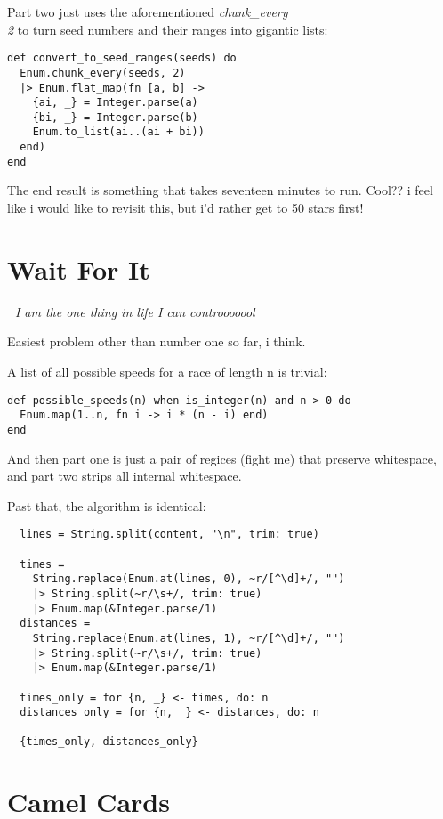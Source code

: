 \documentclass{article}
\begin{document}
Part two just uses the aforementioned \textit{chunk\_every\\2} to turn seed numbers and their ranges into gigantic lists:
\begin{verbatim}
def convert_to_seed_ranges(seeds) do
  Enum.chunk_every(seeds, 2)
  |> Enum.flat_map(fn [a, b] ->
    {ai, _} = Integer.parse(a)
    {bi, _} = Integer.parse(b)
    Enum.to_list(ai..(ai + bi))
  end)
end
\end{verbatim}

The end result is something that takes seventeen minutes to run. Cool?? i feel like i would like to revisit this, but i'd rather get to 50 stars first!

\section{Wait For It}

\textit{🎵 I am the one thing in life I can controoooool~}

Easiest problem other than number one so far, i think.

A list of all possible speeds for a race of length n is trivial:
\begin{verbatim}
def possible_speeds(n) when is_integer(n) and n > 0 do
  Enum.map(1..n, fn i -> i * (n - i) end)
end
\end{verbatim}

And then part one is just a pair of regices (fight me) that preserve whitespace, and part two strips all internal whitespace.

Past that, the algorithm is identical:
\begin{verbatim}
  lines = String.split(content, "\n", trim: true)

  times =
    String.replace(Enum.at(lines, 0), ~r/[^\d]+/, "")
    |> String.split(~r/\s+/, trim: true)
    |> Enum.map(&Integer.parse/1)
  distances =
    String.replace(Enum.at(lines, 1), ~r/[^\d]+/, "")
    |> String.split(~r/\s+/, trim: true)
    |> Enum.map(&Integer.parse/1)

  times_only = for {n, _} <- times, do: n
  distances_only = for {n, _} <- distances, do: n

  {times_only, distances_only}
\end{verbatim}


\section{Camel Cards}
\end{document}
